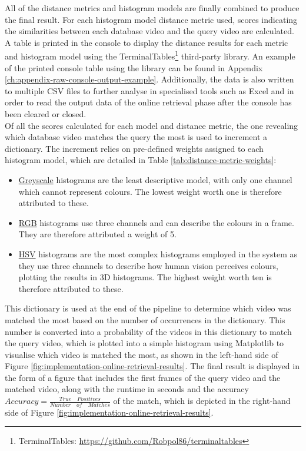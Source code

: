 All of the distance metrics and histogram models are finally combined to produce the final result. For each histogram model distance metric used, scores indicating the similarities between each database video and the query video are calculated. A table is printed in the console to display the distance results for each metric and histogram model using the TerminalTables\footnote{TerminalTables: \url{https://github.com/Robpol86/terminaltables}} third-party library. An example of the printed console table using the library can be found in Appendix \ref{ch:appendix-raw-console-output-example}. Additionally, the data is also written to multiple CSV files to further analyse in specialised tools such as Excel and in order to read the output data of the online retrieval phase after the console has been cleared or closed.\\

Of all the scores calculated for each model and distance metric, the one revealing which database video matches the query the most is used to increment a dictionary. The increment relies on pre-defined weights assigned to each histogram model, which are detailed in Table \ref{tab:distance-metric-weights}:

\begin{itemize}
    \item \underline{Greyscale} histograms are the least descriptive model, with only one channel which cannot represent colours. The lowest weight worth one is therefore attributed to these.
    \item \underline{RGB} histograms use three channels and can describe the colours in a frame. They are therefore attributed a weight of 5.
    \item \underline{HSV} histograms are the most complex histograms employed in the system as they use three channels to describe how human vision perceives colours, plotting the results in 3D histograms. The highest weight worth ten is therefore attributed to these.
\end{itemize}



This dictionary is used at the end of the pipeline to determine which video was matched the most based on the number of occurrences in the dictionary. This number is converted into a probability of the videos in this dictionary to match the query video, which is plotted into a simple histogram using Matplotlib to visualise which video is matched the most, as shown in the left-hand side of Figure \ref{fig:implementation-online-retrieval-results}. The final result is displayed in the form of a figure that includes the first frames of the query video and the matched video, along with the runtime in seconds and the accuracy $Accuracy = \frac{True \quad Positives}{Number \quad of \quad Matches}$ of the match, which is depicted in the right-hand side of Figure \ref{fig:implementation-online-retrieval-results}.\\

